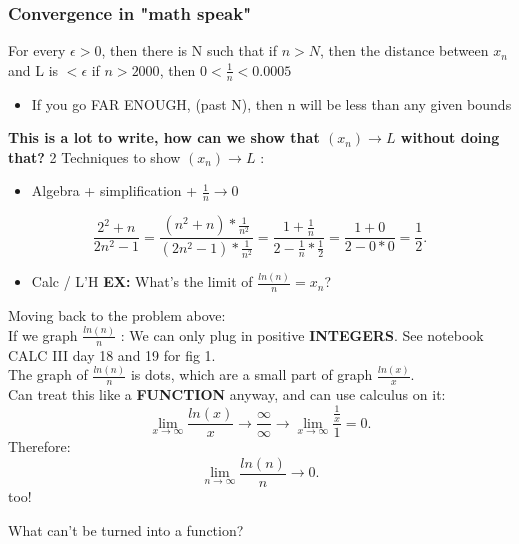 \documentclass[]{report}
\begin{document}
\subsubsection*{Convergence in "math speak"}
For every $\epsilon > 0$, then there is N such that if $n > N$, then the distance between $x_n$ and L is $< \epsilon$
if $n > 2000$, then $0 < \frac{1}{n} < 0.0005$
\\
\begin{itemize}
        \item If you go FAR ENOUGH, (past N), then n will be less than any given bounds 
\end{itemize}
\textbf{This is a lot to write, how can we show that $(x_n) \to L$ without doing that?}
2 Techniques to show $(x_n)\to L$ :
\begin{itemize}
        \item Algebra + simplification + $\frac{1}{n} \to 0$

\end{itemize}
                \[
                        \frac{2^{2} + n }{2n^{2}- 1} = \frac{(n^{2} + n) * \frac{1}{n^{2}}}{(2n^{2}-1)*\frac{1}{n^{2}}} = \frac{1 + \frac{1}{n}}{2 - \frac{1}{n} * \frac{1}{2}} = \frac{1 + 0}{2 - 0 * 0} = \frac{1}{2} 
                .\] 
                \begin{itemize}
                        \item Calc / L'H
                                \subitem \textbf{EX:} What's the limit of  $\frac{ln(n)}{n}= x_n$?
\end{itemize}

\noindent{}
Moving back to the problem above: 
\\
If we graph $\frac{ln(n)}{n}$ : We can only plug in positive \textbf{INTEGERS}. See notebook CALC III day 18 and 19 for fig 1.
\\
The graph of $\frac{ln(n)}{n}$ is dots, which are a small part of graph $\frac{ln(x)}{x}$. 
\\
Can treat this like a \textbf{FUNCTION} anyway, and can use calculus on it:
\[
        \lim_{x\to\infty} \frac{ln(x)}{x} \to \frac{\infty}{\infty} \to \lim_{x\to\infty} \frac{\frac{1}{x}}{1} = 0
.\] 
Therefore: 
\\
\[
        \lim_{n\to\infty} \frac{ln(n)}{n} \to 0
.\] too!

\noindent{}
What can't be turned into a function? 
\\
\noindent{}
        
\end{document}
